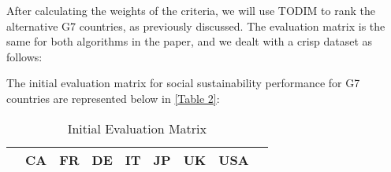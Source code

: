 \documentclass{infor}
\theoremstyle{remark}
\begin{document}
After calculating the weights of the criteria, we will use TODIM to rank the alternative G7 countries, as previously discussed. The evaluation matrix is the same for both algorithms in the paper, and we dealt with a crisp dataset as follows:
\begin{steps}
\item The initial evaluation matrix for social sustainability
performance for G7 countries are represented below in \autoref{Table 2}:

\begin{table}[!htp]\centering
\caption{Initial Evaluation Matrix}\label{Table 2}
\scriptsize
\begin{tabular}{lrrrrrrrr}\toprule

& CA & FR & DE & IT & JP & UK & USA\\ \toprule


\end{tabular}
\end{table}
\end{steps}
\end{document}

